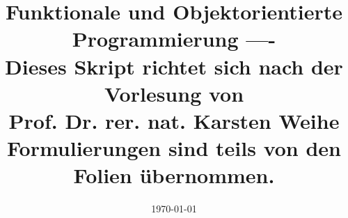 \documentclass[a4paper,12pt,liststotoc, parskip=half]{scrreprt}
\begin{document}
    \pagestyle{fancy}

    \title{
      Funktionale und Objektorientierte Programmierung
      \large ---- \\ Dieses Skript richtet sich nach der Vorlesung von \\ Prof. Dr. rer. nat. Karsten Weihe \\ Formulierungen sind teils von den Folien übernommen.}
		\author{}
    \date{\today}
    \maketitle
		\pagestyle{fancy}
    \lhead{}
    \chead{\leftmark}
    \rhead{}

    \cfoot{\thepage}
    \rfoot{ %
    \date{\today} }

    \begingroup
      \renewcommand*{\chapterpagestyle}{empty}

      \pagestyle{empty}
      \tableofcontents
    \endgroup


    \clearpage

    
    
    
    
		
    \appendix

    
\end{document}
